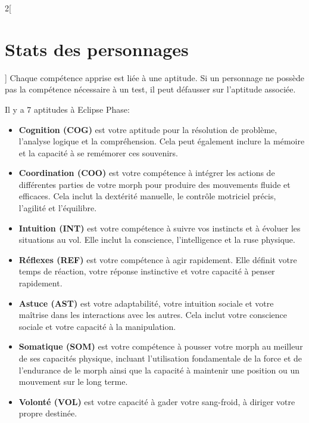 \documentclass[a4paper,9pt]{article}
\begin{document}
\begin{multicols}{2}[\section{Stats des personnages} \label{sec:character-stats}]
Chaque compétence apprise est liée à une aptitude. Si un personnage ne possède
pas la compétence nécessaire à un test, il peut défausser sur l'aptitude
associée. 

Il y a 7 aptitudes à Eclipse Phase: 

\begin{itemize}
\item \textbf{Cognition (COG)} est votre aptitude pour la résolution de
problème, l'analyse logique et la compréhension. Cela peut également inclure la
mémoire et la capacité à se remémorer ces souvenirs.
\item \textbf{Coordination (COO)} est votre compétence à intégrer les actions
de différentes parties de votre morph pour produire des mouvements fluide et
efficaces. Cela inclut la dextérité manuelle, le contrôle motriciel précis,
l'agilité et l'équilibre.
\item \textbf{Intuition (INT)} est votre compétence à suivre vos instincts et à
évoluer les situations au vol. Elle inclut la conscience, l'intelligence et la
ruse physique.
\item \textbf{Réflexes (REF)} est votre compétence à agir rapidement. Elle
définit votre temps de réaction, votre réponse instinctive et votre capacité à
penser rapidement.
\item \textbf{Astuce (AST)} est votre adaptabilité, votre intuition sociale et
votre maîtrise dans les interactions avec les autres. Cela inclut votre
conscience sociale et votre capacité à la manipulation.
\item \textbf{Somatique (SOM)} est votre compétence à pousser votre morph au
meilleur de ses capacités physique, incluant l'utilisation fondamentale de la
force et de l'endurance de le morph ainsi que la capacité à maintenir une
position ou un mouvement sur le long terme.
\item \textbf{Volonté (VOL)} est votre capacité à gader votre sang-froid, à
diriger votre propre destinée.
\end{itemize} 

\end{multicols}
\end{document}
